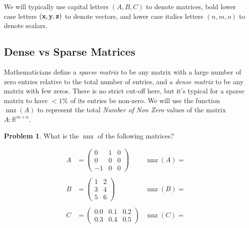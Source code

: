 \documentclass[10pt]{article}
\theoremstyle{definition}
\newtheorem{problem}{Problem}
\newcommand{\R}{\mathbb R}
\DeclareMathOperator{\nnz}{nnz}
\begin{document}
We will typically use capital letters $(A, B, C)$ to denote matrices,
bold lower case letters $(\textbf x, \textbf y, \textbf z)$ to denote vectors,
and lower case italics letters $(n, m, o)$ to denote scalars.

\subsection{Dense vs Sparse Matrices}

Mathematicians define a \emph{sparse matrix} to be any matrix with a large number of zero entries relative to the total number of entries,
and a \emph{dense matrix} to be any matrix with few zeros.
There is no strict cut-off here, but it's typical for a sparse matrix to have $< 1\%$ of its entries be non-zero.
We will use the function $\nnz(A)$ to represent the total \emph{Number of Non Zero} values of the matrix $A:\R^{m\times n}$.

\begin{problem}
What is the $\nnz$ of the following matrices?

\begin{align*}
    A &= \begin{pmatrix} 0 & 1 & 0 \\ 0 & 0 & 0 \\ -1 & 0 & 0 \end{pmatrix} & \nnz(A) = \\
        \\
    B &= \begin{pmatrix} 1 & 2 \\ 3 & 4 \\ 5 & 6 \end{pmatrix} & \nnz(B) = \\
        \\
    C &= \begin{pmatrix} 0.0 & 0.1 & 0.2 \\ 0.3 & 0.4 & 0.5 \end{pmatrix} & \nnz(C) = \\
\end{align*}

\end{problem}
\vspace{4in}
\end{document}
